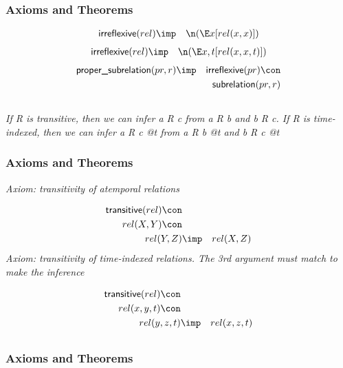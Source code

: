 \subsubsection{Axioms and Theorems}


\begin{eqnarray*}
 \pr{irreflexive}(rel) &\imp & \n( \E x[rel(x, x) ])
\end{eqnarray*}
\begin{eqnarray*}
 \pr{irreflexive}(rel) &\imp & \n( \E x, t[rel(x, x, t) ])
\end{eqnarray*}
\begin{eqnarray*}
 \pr{proper\_subrelation}(pr, r) &\imp & \pr{irreflexive}(pr) \con \\
&& \pr{subrelation}(pr, r) 
\end{eqnarray*}

\subsection{ }
\emph{If R is transitive, then we can infer a R c from a R b and b R c. If R is time-indexed, then we can infer a R c @t from a R b @t and b R c @t}

\subsubsection{Axioms and Theorems}


\emph{Axiom: transitivity of atemporal relations}

\begin{eqnarray*}
 \pr{transitive}(rel) \con \\
rel(X, Y) \con \\
rel(Y, Z) &\imp &rel(X, Z) 
\end{eqnarray*}
\emph{Axiom: transitivity of time-indexed relations. The 3rd argument must match to make the inference}

\begin{eqnarray*}
 \pr{transitive}(rel) \con \\
rel(x, y, t) \con \\
rel(y, z, t) &\imp &rel(x, z, t) 
\end{eqnarray*}

\subsection{ }
\subsubsection{Axioms and Theorems}


